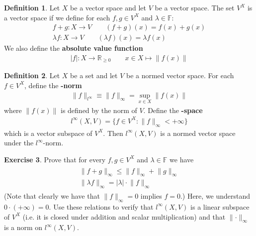 \documentclass[12pt,b5paper,notitlepage]{article}
\theoremstyle{definition}
\newtheorem{df}{Definition}[section]
\newtheorem{exe}[df]{Exercise}
\theoremstyle{plain}
\newcommand{\Rbb}{\mathbb R}
\newcommand{\Fbb}{\mathbb F}
\numberwithin{equation}{section}
\begin{document}
\begin{df}
Let $X$ be a vector space and let $V$ be a vector space. The set $V^X$  is a vector space if we define for each $f,g\in V^X$ and $\lambda\in\Fbb$:
\begin{gather*}
f+g:X\rightarrow V\qquad (f+g)(x)=f(x)+g(x)\\
\lambda f:X\rightarrow V\qquad (\lambda f)(x)=\lambda f(x)
\end{gather*}
We also define the \textbf{absolute value function} 
\begin{align}
|f|:X\rightarrow\Rbb_{\geq 0}\qquad x\in X\mapsto \lVert f(x)\lVert
\end{align}
\end{df}



\begin{df}
Let $X$ be a set and let $V$ be a normed vector space. For each $f\in V^X$, define the  \textbf{-norm}
\begin{align}
\lVert f\lVert_{l^\infty}\equiv \lVert f\lVert_\infty=\sup_{x\in X}\lVert f(x)\lVert
\end{align}
where $\lVert f(x)\lVert$ is defined by the norm of $V$. Define the \textbf{-space}  
\begin{align}
l^\infty(X,V)=\{f\in V^X:\lVert f\lVert_\infty<+\infty\}
\end{align}
which is a vector subspace of $V^X$. Then $l^\infty(X,V)$ is a normed vector space under the $l^\infty$-norm.
\end{df}





\begin{exe}
Prove that for every $f,g\in V^X$ and $\lambda\in\Fbb$ we have
\begin{gather}\label{eq23}
\begin{gathered}
\lVert f+g\lVert_\infty\leq \lVert f\lVert_\infty+\lVert g\lVert_\infty\\
\lVert \lambda f\lVert_\infty=|\lambda|\cdot \lVert f\lVert_\infty
\end{gathered}
\end{gather}
(Note that clearly we have that $\lVert f\lVert_\infty=0$ implies $f=0$.) Here, we understand $0\cdot (+\infty)=0$. Use these relations to verify that $l^\infty(X,V)$ is a linear subspace of $V^X$ (i.e. it is closed under addition and scalar multiplication) and that $\lVert\cdot\lVert_\infty$ is a norm on $l^\infty(X,V)$.  \hfill\qedsymbol
\end{exe}
\end{document}
